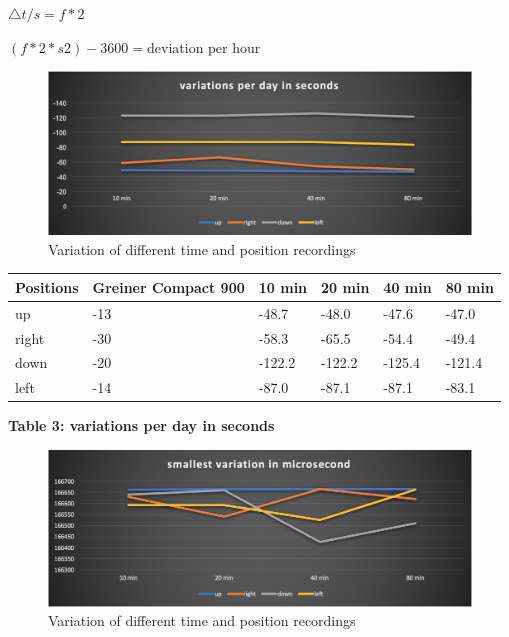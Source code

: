\documentclass[12pt, a4paper]{report}
\begin{document}
    \(\triangle t / s = f*2\)
    
    \((f*2*s2)-3600=\text{deviation per hour}\)
    
    \bigskip
    \noindent
    \begin{figure}
    \centering
        \includegraphics[scale=0.3]{Images/variations_per_day.png}
    
    \caption{ Variation of different time and position recordings}
    \end{figure}    
    
    \begin{table}[H]
        \begin{tabular}{|l|l|l|l|l|l|}
        \hline
        Positions & Greiner Compact 900 & 10 min & 20 min & 40 min & 80 min \\ \hline
        up        & -13                 & -48.7     & -48.0     & -47.6      & -47.0      \\ \hline
        right     & -30                 & -58.3      & -65.5    & -54.4      & -49.4      \\ \hline
        down      & -20                 & -122.2    & -122.2     & -125.4    & -121.4      \\ \hline
        left      & -14                 & -87.0	   & -87.1	  & -87.1	  & -83.1      \\ \hline
        \end{tabular}
    \end{table}
    \begin{center}    
    {\bf Table 3: variations per day in seconds} 
    \end{center}
    
    \bigskip
    \noindent
    \begin{figure}
    \centering
    \includegraphics[scale=0.3]{Images/smallest_variation.png}
    
    \caption{ Variation of different time and position recordings}
    \end{figure} 
    
\end{document}
